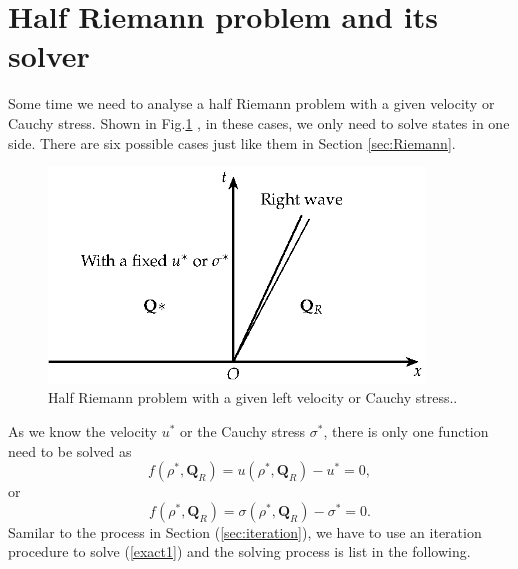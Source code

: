 \documentclass{article}
\numberwithin{equation}{section}
\numberwithin{table}{section}
\begin{document}
%
%
%
\section{Half Riemann problem and its solver}
Some time we need to analyse a half Riemann problem with a given velocity or Cauchy stress. Shown in Fig.\ref{fig:half} , in these cases, we only need to solve states in one side. There are six possible cases just like them in Section \ref{sec:Riemann}.

\begin{figure}
  \centering
  \includegraphics[width= 10cm] {Tikz-figure8.eps}
  \caption{Half Riemann problem  with a given left velocity or Cauchy stress..}
  \label{fig:half}
\end{figure}

As we know the velocity $u^*$ or the Cauchy stress $\sigma ^*$, there is only one function need to be solved as
\begin{equation}\label{eq:halfu}
  f(\rho^*,\mathbf{Q}_R) =u(\rho^*,\mathbf{Q}_R) - u^* = 0,
\end{equation}
or
\begin{equation}\label{eq:halfs}
  f(\rho^*,\mathbf{Q}_R) =\sigma(\rho^*,\mathbf{Q}_R) - \sigma^* = 0.
\end{equation}
Samilar to the process in Section (\ref{sec:iteration}), we have to use an iteration procedure to solve (\ref{exact1}) and
the solving process is list in the following.
\end{document}
